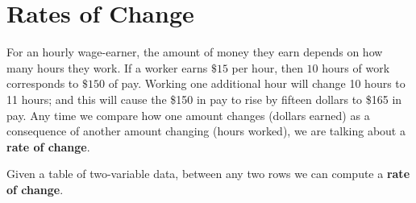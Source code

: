 \documentclass[nooutcomes]{ximera}
\begin{document}

\section{Rates of Change}

For an hourly wage-earner, the amount of money they earn depends on how many hours they work. If a worker earns $\$15$ per hour, then $10$
hours of work corresponds to $\$150$ of pay. Working one additional hour will change 10 hours to 11 hours; and this will cause the \$150 in pay to rise by fifteen dollars to \$165 in pay. Any time we compare how one amount changes (dollars earned) as a consequence of another amount changing (hours worked), we are talking about a \textbf{rate of change}.

Given a table of two-variable data, between any two rows we can compute a \textbf{rate of change}.
\end{document}
